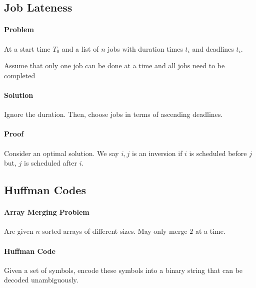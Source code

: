 


\subsection{Job Lateness}
\paragraph{Problem}
At a start time \(T_0\) and a list of \(n\) jobs with duration times
\(t_i\) and deadlines \(t_i\).

Assume that only one job can be done at a time and all jobs need to
be completed

\paragraph{Solution}
Ignore the duration. Then, choose jobs in terms of ascending deadlines.

\paragraph{Proof}
Consider an optimal solution.
We say \(i, j\) is an inversion if \(i\) is scheduled before
\(j\) but, \(j\) is scheduled after \(i\).

\subsection{Huffman Codes}
\paragraph{Array Merging Problem}
Are given \(n\) sorted arrays of different
sizes. May only merge \(2\) at a time.

\paragraph{Huffman Code}
Given a set of symbols, encode these symbols into a binary string
that can be decoded unambiguously.

